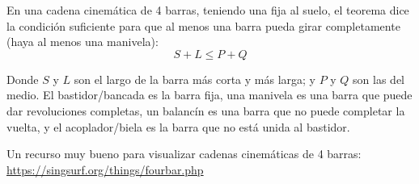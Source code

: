 En una cadena cinemática de 4 barras, teniendo una fija al suelo, el teorema dice la condición suficiente para que al menos una barra pueda girar completamente (haya al menos una manivela):
$$
S + L \leq P + Q
$$

Donde $S$ y $L$ son el largo de la barra más corta y más larga; y $P$ y $Q$ son las del medio. El bastidor/bancada es la barra fija, una manivela es una barra que puede dar revoluciones completas, un balancín es una barra que no puede completar la vuelta, y el acoplador/biela es la barra que no está unida al bastidor.

Un recurso muy bueno para visualizar cadenas cinemáticas de 4 barras: {\color{blue}\url{https://singsurf.org/things/fourbar.php}}
